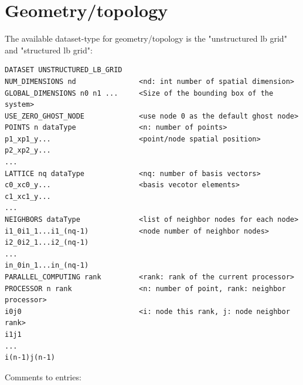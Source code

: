 \documentclass[11pt,a4paper]{report}
\begin{document}
\section{Geometry/topology}
The available dataset-type for geometry/topology is the "unstructured lb grid" and "structured lb grid":
\begin{verbatim}
DATASET UNSTRUCTURED_LB_GRID
NUM_DIMENSIONS nd               <nd: int number of spatial dimension>
GLOBAL_DIMENSIONS n0 n1 ...     <Size of the bounding box of the system>
USE_ZERO_GHOST_NODE             <use node 0 as the default ghost node>
POINTS n dataType               <n: number of points>
p1_xp1_y...                     <point/node spatial position>
p2_xp2_y...
...
LATTICE nq dataType             <nq: number of basis vectors>
c0_xc0_y...                     <basis vecotor elements>
c1_xc1_y...
...
NEIGHBORS dataType              <list of neighbor nodes for each node>
i1_0i1_1...i1_(nq-1)            <node number of neighbor nodes>
i2_0i2_1...i2_(nq-1)
...
in_0in_1...in_(nq-1)
PARALLEL_COMPUTING rank         <rank: rank of the current processor>
PROCESSOR n rank                <n: number of point, rank: neighbor processor>
i0j0                            <i: node this rank, j: node neighbor rank>
i1j1
...
i(n-1)j(n-1)
\end{verbatim} 
Comments to entries:
\end{document}
